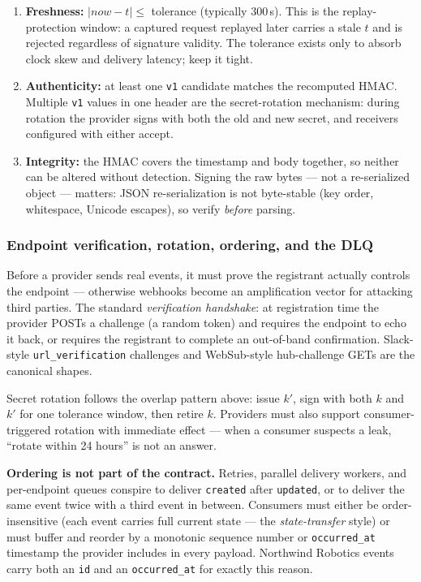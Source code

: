 \begin{enumerate}
  \item \textbf{Freshness:} $|now - t| \leq$ tolerance (typically 300\,s).
        This is the replay-protection window: a captured request replayed
        later carries a stale $t$ and is rejected regardless of signature
        validity. The tolerance exists only to absorb clock skew and delivery
        latency; keep it tight.
  \item \textbf{Authenticity:} at least one \texttt{v1} candidate matches the
        recomputed HMAC. Multiple \texttt{v1} values in one header are the
        secret-rotation mechanism: during rotation the provider signs with
        both the old and new secret, and receivers configured with either
        accept.
  \item \textbf{Integrity:} the HMAC covers the timestamp and body together,
        so neither can be altered without detection. Signing the raw bytes
        --- not a re-serialized object --- matters: JSON re-serialization is
        not byte-stable (key order, whitespace, Unicode escapes), so verify
        \emph{before} parsing.
\end{enumerate}

\subsubsection{Endpoint verification, rotation, ordering, and the DLQ}

Before a provider sends real events, it must prove the registrant actually
controls the endpoint --- otherwise webhooks become an amplification vector
for attacking third parties. The standard \emph{verification handshake}: at
registration time the provider POSTs a challenge (a random token) and
requires the endpoint to echo it back, or requires the registrant to complete
an out-of-band confirmation. Slack-style \texttt{url\_verification}
challenges and WebSub-style hub-challenge GETs are the canonical shapes.

Secret rotation follows the overlap pattern above: issue $k'$, sign with both
$k$ and $k'$ for one tolerance window, then retire $k$. Providers must also
support consumer-triggered rotation with immediate effect --- when a consumer
suspects a leak, ``rotate within 24 hours'' is not an answer.

\textbf{Ordering is not part of the contract.} Retries, parallel delivery
workers, and per-endpoint queues conspire to deliver \texttt{created} after
\texttt{updated}, or to deliver the same event twice with a third event in
between. Consumers must either be order-insensitive (each event carries full
current state --- the \emph{state-transfer} style) or must buffer and reorder
by a monotonic sequence number or \texttt{occurred\_at} timestamp the
provider includes in every payload. Northwind Robotics events carry both an
\texttt{id} and an \texttt{occurred\_at} for exactly this reason.

